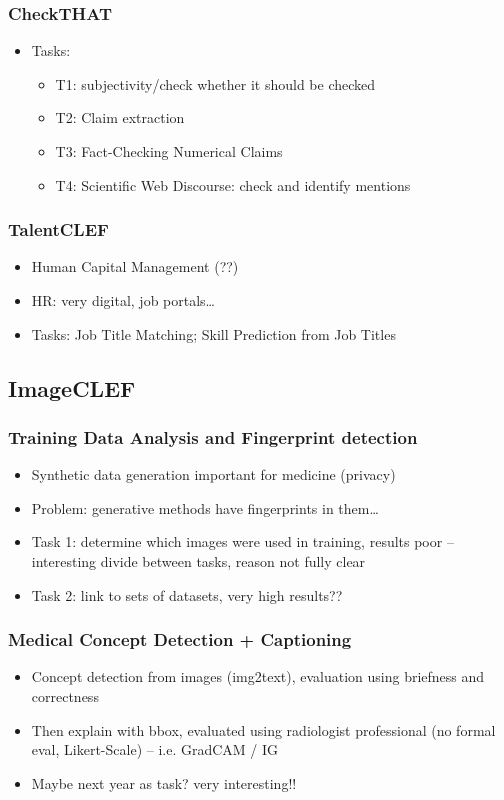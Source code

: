 \documentclass[a4paper]{article}
\begin{document}
\subsubsection{CheckTHAT}
\begin{itemize}
    \item Tasks:
          \begin{itemize}
              \item T1: subjectivity/check whether it should be checked
              \item T2: Claim extraction
              \item T3: Fact-Checking Numerical Claims
              \item T4: Scientific Web Discourse: check and identify mentions
          \end{itemize}
\end{itemize}
\subsubsection{TalentCLEF}
\begin{itemize}
    \item Human Capital Management (??)
    \item HR: very digital, job portals\dots
    \item Tasks: Job Title Matching; Skill Prediction from Job Titles
\end{itemize}
\subsection{ImageCLEF}
\subsubsection{Training Data Analysis and Fingerprint detection}
\begin{itemize}
    \item Synthetic data generation important for medicine (privacy)
    \item Problem: generative methods have fingerprints in them\dots
    \item Task 1: determine which images were used in training, results poor -- interesting divide between tasks, reason not fully clear
    \item Task 2: link to sets of datasets, very high results??
\end{itemize}
\subsubsection{Medical Concept Detection + Captioning}
\begin{itemize}
    \item Concept detection from images (img2text), evaluation using briefness and correctness
    \item Then explain with bbox, evaluated using radiologist professional (no formal eval, Likert-Scale) -- i.e. GradCAM / IG
    \item Maybe next year as task? very interesting!!
\end{itemize}
\end{document}
